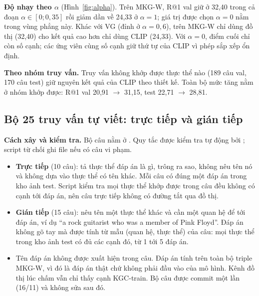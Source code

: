 \textbf{Độ nhạy theo $\alpha$} (Hình~\ref{fig:alpha}). Trên MKG-W, R@1 val giữ ở 32,40 trong cả đoạn $\alpha \in [0; 0{,}35]$
rồi giảm dần về 24,33 ở $\alpha = 1$; giá trị được chọn $\alpha = 0$ nằm trong vùng phẳng này. Khác với VG (đỉnh ở
$\alpha = 0{,}6$), trên MKG-W chỉ dùng đồ thị (32,40) cho kết quả cao hơn chỉ dùng CLIP (24,33). Với $\alpha = 0$, điểm cuối
chỉ còn số cạnh; các ứng viên cùng số cạnh giữ thứ tự của CLIP vì phép sắp xếp ổn định.

\textbf{Theo nhóm truy vấn.} Truy vấn không khớp được thực thể nào (189 câu val, 170 câu test) giữ nguyên kết quả của CLIP
theo thiết kế. Toàn bộ mức tăng nằm ở nhóm khớp được: R@1 val 20,91 $\to$ 31,15, test 22,71 $\to$ 28,81.

\subsection{Bộ 25 truy vấn tự viết: trực tiếp và gián tiếp}
\label{sec:l2-hand}

\textbf{Cách xây và kiểm tra.} Bộ câu nằm ở . Quy tắc được kiểm tra tự động bởi
; script từ chối ghi file nếu có câu vi phạm.
\begin{itemize}
\item \textbf{Trực tiếp} (10 câu): tả thực thể đáp án là gì, trông ra sao, không nêu tên nó và không dựa vào thực thể có tên
khác. Mỗi câu có đúng một đáp án trong kho ảnh test. Script kiểm tra mọi thực thể khớp được trong câu đều không có cạnh tới
đáp án, nên câu trực tiếp không có đường tắt qua đồ thị.
\item \textbf{Gián tiếp} (15 câu): nêu tên một thực thể khác và cần một quan hệ để tới đáp án, ví dụ ``a rock guitarist who
was a member of Pink Floyd''. Đáp án không gõ tay mà được tính từ mẫu (quan hệ, thực thể) của câu: mọi thực thể trong kho
ảnh test có đủ các cạnh đó, từ 1 tới 5 đáp án.
\item Tên đáp án không được xuất hiện trong câu. Đáp án tính trên toàn bộ triple MKG-W, vì đó là đáp án thật chứ không phải
đầu vào của mô hình. Kênh đồ thị lúc chấm vẫn chỉ thấy cạnh KGC-train. Bộ câu được commit một lần (16/11) và không sửa sau đó.
\end{itemize}


